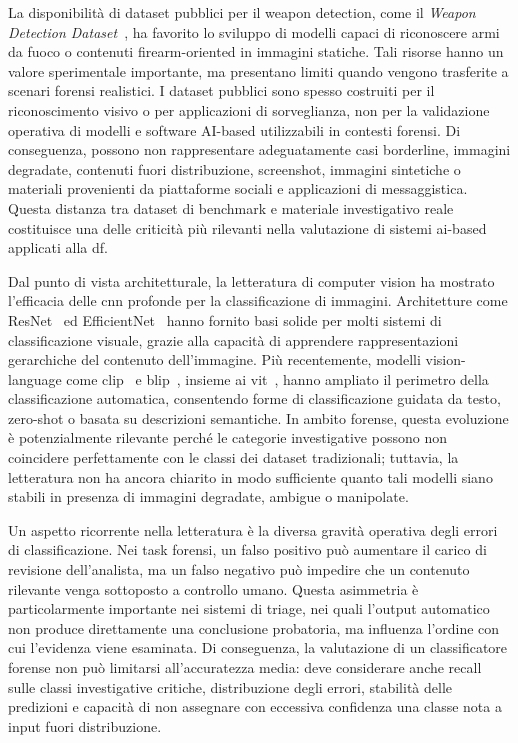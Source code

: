 La disponibilità di dataset pubblici per il weapon detection, come il \textit{Weapon Detection Dataset}~\cite{Sanyal2023KaggleWeapon}, ha favorito lo sviluppo di modelli capaci di riconoscere armi da fuoco o contenuti firearm-oriented in immagini statiche. Tali risorse hanno un valore sperimentale importante, ma presentano limiti quando vengono trasferite a scenari forensi realistici. I dataset pubblici sono spesso costruiti per il riconoscimento visivo o per applicazioni di sorveglianza, non per la validazione operativa di modelli e software AI-based utilizzabili in contesti forensi. Di conseguenza, possono non rappresentare adeguatamente casi borderline, immagini degradate, contenuti fuori distribuzione, screenshot, immagini sintetiche o materiali provenienti da piattaforme sociali e applicazioni di messaggistica. Questa distanza tra dataset di benchmark e materiale investigativo reale costituisce una delle criticità più rilevanti nella valutazione di sistemi \gls{ai}-based applicati alla \gls{df}.

Dal punto di vista architetturale, la letteratura di computer vision ha mostrato l'efficacia delle \gls{cnn} profonde per la classificazione di immagini. Architetture come ResNet~\cite{he2016deep} ed EfficientNet~\cite{tan2019efficientnet} hanno fornito basi solide per molti sistemi di classificazione visuale, grazie alla capacità di apprendere rappresentazioni gerarchiche del contenuto dell'immagine. Più recentemente, modelli vision-language come \gls{clip}~\cite{radford2021learning} e \gls{blip}~\cite{li2022blip}, insieme ai \gls{vit}~\cite{dosovitskiy2020image}, hanno ampliato il perimetro della classificazione automatica, consentendo forme di classificazione guidata da testo, zero-shot o basata su descrizioni semantiche. In ambito forense, questa evoluzione è potenzialmente rilevante perché le categorie investigative possono non coincidere perfettamente con le classi dei dataset tradizionali; tuttavia, la letteratura non ha ancora chiarito in modo sufficiente quanto tali modelli siano stabili in presenza di immagini degradate, ambigue o manipolate.

Un aspetto ricorrente nella letteratura è la diversa gravità operativa degli errori di classificazione. Nei task forensi, un falso positivo può aumentare il carico di revisione dell'analista, ma un falso negativo può impedire che un contenuto rilevante venga sottoposto a controllo umano. Questa asimmetria è particolarmente importante nei sistemi di triage, nei quali l'output automatico non produce direttamente una conclusione probatoria, ma influenza l'ordine con cui l'evidenza viene esaminata. Di conseguenza, la valutazione di un classificatore forense non può limitarsi all'accuratezza media: deve considerare anche recall sulle classi investigative critiche, distribuzione degli errori, stabilità delle predizioni e capacità di non assegnare con eccessiva confidenza una classe nota a input fuori distribuzione.

